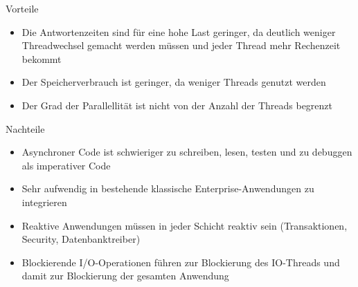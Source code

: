 Vorteile
\begin{itemize}
    \item Die Antwortenzeiten sind für eine hohe Last geringer, da deutlich weniger Threadwechsel gemacht werden müssen und jeder Thread
          mehr Rechenzeit bekommt
    \item Der Speicherverbrauch ist geringer, da weniger Threads genutzt werden
    \item Der Grad der Parallellität ist nicht von der Anzahl der Threads begrenzt
\end{itemize}
Nachteile
\begin{itemize}
    \item Asynchroner Code ist schwieriger zu schreiben, lesen, testen und zu debuggen als imperativer Code
    \item Sehr aufwendig in bestehende klassische Enterprise-Anwendungen zu integrieren
    \item Reaktive Anwendungen müssen in jeder Schicht reaktiv sein (Transaktionen, Security, Datenbanktreiber)
    \item Blockierende I/O-Operationen führen zur Blockierung des IO-Threads und damit zur Blockierung der gesamten Anwendung
\end{itemize}

